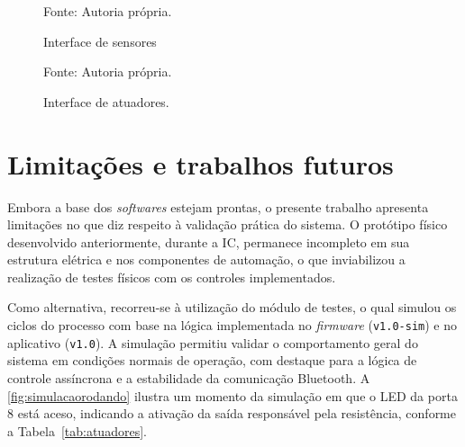 \begin{figure}[H]
    \caption{Interface de sensores}
    \label{fig:sensors}
    \centering
    \hfill
    \hfill
    \hfill
    \hfill


    {\centering\footnotesize Fonte: Autoria própria.\par}

  \end{figure}

  \begin{figure}[H]
    \caption{Interface de atuadores.}
    \label{fig:actuators}
    \centering
    \hfill
    \hfill
    \hfill
    \hfill


    {\centering\footnotesize Fonte: Autoria própria.\par}

  \end{figure}

\section{Limitações e trabalhos futuros}

Embora a base dos \textit{softwares} estejam prontas, o presente trabalho apresenta limitações no que diz respeito à validação prática do sistema. O protótipo físico desenvolvido anteriormente, durante a IC, permanece incompleto em sua estrutura elétrica e nos componentes de automação, o que inviabilizou a realização de testes físicos com os controles implementados.
  
Como alternativa, recorreu-se à utilização do módulo de testes, o qual simulou os ciclos do processo com base na lógica implementada no \textit{firmware} (\texttt{v1.0-sim}) e no aplicativo (\texttt{v1.0}). A simulação permitiu validar o comportamento geral do sistema em condições normais de operação, com destaque para a lógica de controle assíncrona e a estabilidade da comunicação Bluetooth. A \autoref{fig:simulacaorodando} ilustra um momento da simulação em que o LED da porta 8 está aceso, indicando a ativação da saída responsável pela resistência, conforme a Tabela~\ref{tab:atuadores}.

